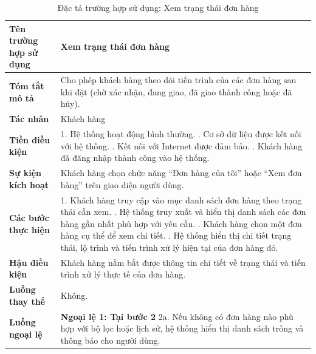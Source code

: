 \begin{longtable}{|>{\bfseries}p{4cm}|p{11.5cm}|}
\caption{Đặc tả trường hợp sử dụng: Xem trạng thái đơn hàng}
\label{tab:uc-view-order-status} \\
\hline
\textbf{Tên trường hợp sử dụng} & Xem trạng thái đơn hàng \\
\hline
\textbf{Tóm tắt mô tả} & Cho phép khách hàng theo dõi tiến trình của các đơn hàng sau khi đặt (chờ xác nhận, đang giao, đã giao thành công hoặc đã hủy). \\
\hline
\textbf{Tác nhân} & Khách hàng \\
\hline
\textbf{Tiền điều kiện} & 1. Hệ thống hoạt động bình thường. \newline
2. Cơ sở dữ liệu được kết nối với hệ thống. \newline
3. Kết nối với Internet được đảm bảo. \newline
4. Khách hàng đã đăng nhập thành công vào hệ thống. \\
\hline
\textbf{Sự kiện kích hoạt} & Khách hàng chọn chức năng “Đơn hàng của tôi” hoặc “Xem đơn hàng” trên giao diện người dùng. \\
\hline
\textbf{Các bước thực hiện} & 1. Khách hàng truy cập vào mục danh sách đơn hàng theo trạng thái cần xem. \newline
2. Hệ thống truy xuất và hiển thị danh sách các đơn hàng gần nhất phù hợp với yêu cầu. \newline
3. Khách hàng chọn một đơn hàng cụ thể để xem chi tiết. \newline
4. Hệ thống hiển thị chi tiết trạng thái, lộ trình và tiến trình xử lý hiện tại của đơn hàng đó. \\
\hline
\textbf{Hậu điều kiện} & Khách hàng nắm bắt được thông tin chi tiết về trạng thái và tiến trình xử lý thực tế của đơn hàng. \\
\hline
\textbf{Luồng thay thế} & Không. \\
\hline
\textbf{Luồng ngoại lệ} & \textbf{Ngoại lệ 1: Tại bước 2} \newline
2a. Nếu không có đơn hàng nào phù hợp với bộ lọc hoặc lịch sử, hệ thống hiển thị danh sách trống và thông báo cho người dùng. \\
\hline
\end{longtable}

